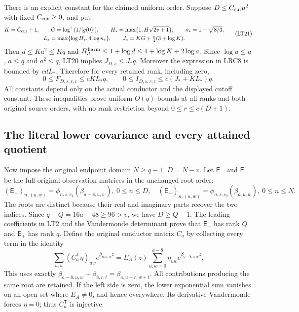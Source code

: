 \documentclass[11pt,a4paper]{article}
\begin{document}
There is an explicit constant for the claimed uniform order. Suppose
$D\le C_{\rm cut}a^2$ with fixed $C_{\rm cut}\ge0$, and put
\[
 \begin{gathered}
 K=C_{\rm cut}+1,\qquad G=\log^+(1/|g(0)|),\qquad
 H_* =\max\{1,H\sqrt{2v+1}\},\qquad
 \kappa_*=1+\sqrt{8/3},\\
 L_* =\max\{\log H_*,4\log\kappa_*\},\qquad
 J_*=KG+\tfrac v4(3+\log K).
 \end{gathered}                                                   \tag{LT21}
\]
Then $d\le Ka^2\le Kq$ and
$H_d^{\rm harm}\le1+\log d\le1+\log K+2\log a$.
Since $\log a\le a$, $a\le q$ and $a^2\le q$, LT20 implies
$J_{D,s}\le J_*q$. Moreover the expression in LRC8 is bounded by
$cdL_*$. Therefore for every retained rank, including zero,
\[
 0\le F_{D,s,r,c}\le cKL_*q,\qquad
 0\le I_{D,s,r,c}\le c(J_*+KL_*)q .                    \tag{LT22}
\]
All constants depend only on the actual conductor and the displayed
cutoff constant. These inequalities prove uniform $O(q)$ bounds at
all ranks and both original source orders, with no rank restriction
beyond $0\le r\le c(D+1)$.

\subsection{The literal lower covariance and every attained quotient}

Now impose the original endpoint domain $N\ge q-1$, $D=N-v$.
Let $\mathsf E_-$ and $\mathsf E_+$ be the full original observation
matrices in the unchanged root order:
\[
 (\mathsf E_-)_{n,(u,w)}=\phi_{n,s,c_1}(\beta_{a-8,u,w}),\ 0\le n\le D,
 \quad
 (\mathsf E_+)_{n,(u,w)}=\phi_{n,s,c_0}(\beta_{a,u,w}),\ 0\le n\le N.
                                                               \tag{LT23}
\]
The roots are distinct because their real and imaginary parts recover
the two indices. Since $q-Q=16a-48\ge96>v$, we have $D\ge Q-1$.
The leading coefficients in LT2 and the Vandermonde determinant prove
that $\mathsf E_-$ has rank $Q$ and $\mathsf E_+$ has rank $q$.
Define the original conductor matrix $C_a$ by collecting every term
in the identity
\[
 \sum_{u,w}(C_a^{\mathsf T}\eta)_{uw}e^{\beta_{a,u,w}z}
 =E_A(z)\sum_{u,w=0}^{a-8}\eta_{uw}e^{\beta_{a-8,u,w}z}.   \tag{LT24}
\]
This uses exactly
$\beta_{a-8,u,w}+\beta_{8,r,t}=\beta_{a,u+r,w+t}$.
All contributions producing the same root are retained.
If the left side is zero, the lower exponential sum vanishes on
an open set where $E_A\ne0$, and hence everywhere. Its derivative
Vandermonde forces $\eta=0$; thus $C_a^{\mathsf T}$ is injective.
\end{document}
